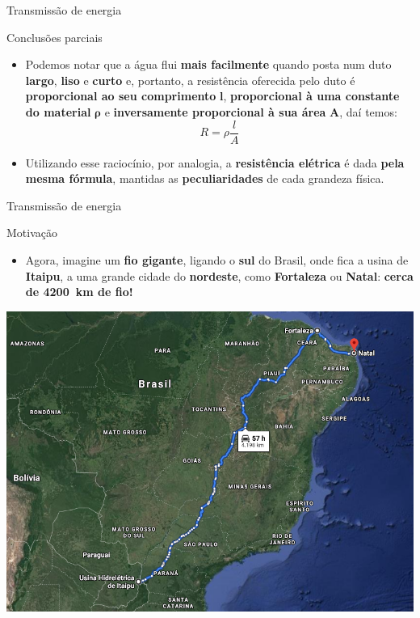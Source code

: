 \begin{frame}{Transmissão de energia}
	\begin{block}{Conclusões parciais}
		\begin{itemize}
			\item Podemos notar que a água flui \textbf{mais facilmente} quando posta num duto \textbf{largo}, \textbf{liso} e \textbf{curto} e, portanto, a resistência oferecida pelo duto é \textbf{proporcional ao seu comprimento} $ \bm{l} $, \textbf{proporcional à uma constante do material} $ \bm{\rho} $ e \textbf{inversamente proporcional à sua área} $ \bm{A} $, daí temos:\[ \boxed{R=\rho\dfrac{l}{A}} \]
			\item Utilizando esse raciocínio, por analogia, a \textbf{resistência elétrica} é dada \textbf{pela mesma fórmula}, mantidas as \textbf{peculiaridades} de cada grandeza física.
		\end{itemize}
	\end{block}
\end{frame}


\begin{frame}{Transmissão de energia}
	\begin{block}{Motivação}
		\begin{itemize}
			\item Agora, imagine um \textbf{fio gigante}, ligando o \textbf{sul} do Brasil, onde fica a usina de \textbf{Itaipu}, a uma grande cidade do \textbf{nordeste}, como \textbf{Fortaleza} ou \textbf{Natal}: \textbf{cerca de \SI{4200}{\kilo\meter} de fio!}
		\end{itemize}
	\end{block}

	\centering
	\includegraphics[height=0.6\textheight]{Figuras/Ch03/fig8}

\end{frame}


